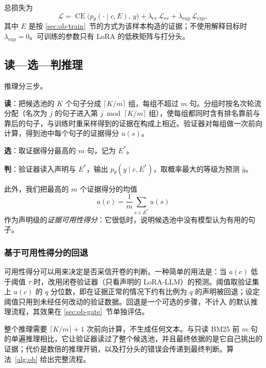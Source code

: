 总损失为
\begin{equation}
\mathcal L=\operatorname{CE}\big(p_\theta(\cdot\mid c,E),\,y\big)+\lambda_{\mathrm{ev}}\,\mathcal L_{\mathrm{ev}}+\lambda_{\mathrm{exp}}\,\mathcal L_{\mathrm{exp}},\label{eq:ob-loss}
\end{equation}
其中 $E$ 是按 \ref{sec:ob-train}~节的方式为该样本构造的证据；不使用解释目标时 $\lambda_{\mathrm{exp}}=0$。可训练的参数只有 LoRA 的低秩矩阵与打分头。

\subsection{读—选—判推理}\label{sec:ob-infer}

推理分三步。

\textbf{读}：把候选池的 $K$ 个句子分成 $\lceil K/m\rceil$ 组，每组不超过 $m$ 句。分组时按名次轮流分配（名次为 $j$ 的句子进入第 $j \bmod \lceil K/m\rceil$ 组），使每组都同时含有排名靠前与靠后的句子，与训练时重采样得到的证据在构成上相近。验证器对每组做一次前向计算，得到池中每个句子的证据得分 $u(s)$。

\textbf{选}：取证据得分最高的 $m$ 句，记为 $E^{*}$。

\textbf{判}：验证器读入声明与 $E^{*}$，输出 $p_\theta(y\mid c,E^{*})$，取概率最大的等级为预测 $\hat y$。

此外，我们把最高的 $m$ 个证据得分的均值
\begin{equation}
a(c)=\frac{1}{m}\sum_{s\in E^{*}}u(s)
\end{equation}
作为声明级的\emph{证据可用性得分}：它很低时，说明候选池中没有模型认为有用的句子。

\subsubsection{基于可用性得分的回退}
可用性得分可以用来决定是否采信开卷的判断。一种简单的用法是：当 $a(c)$ 低于阈值 $\tau$ 时，改用闭卷验证器（只看声明的 LoRA-LLM）的预测。阈值取验证集上 $a(c)$ 的 $q$ 分位数，即在证据正常的情况下约有比例为 $q$ 的声明被回退；设定阈值只用到未经任何改动的验证数据。回退是一个可选的步骤，不计入 \ours{} 的默认推理流程，其效果在 \ref{sec:ob-gate}~节单独评估。

整个推理需要 $\lceil K/m\rceil+1$ 次前向计算，不生成任何文本。与只读 BM25 前 $m$ 句的单遍推理相比，它让验证器读过了整个候选池，并且最终依据的是它自己挑出的证据；代价是数倍的推理开销，以及打分头的错误会传递到最终判断。算法~\ref{alg:ob} 给出完整流程。

